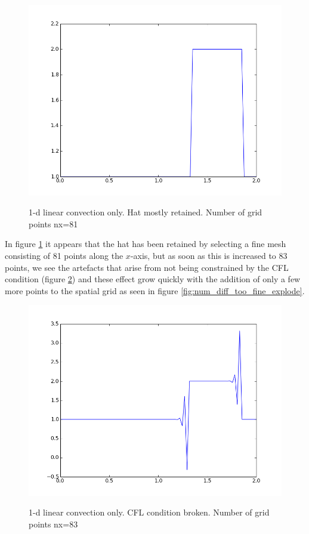 \documentclass[11pt]{article}
\begin{document}
{	\begin{figure}[num_diff_finest_mesh]
	\centering
	\caption{1-d linear convection only. Hat mostly retained. Number of grid points nx=81}
	\includegraphics[scale=0.8]{keep_hat.png}
	\label{fig:num_diff_finest_mesh}
	\end{figure}

In figure \ref{fig:num_diff_finest_mesh} it appears that the hat has been retained by selecting
a fine mesh consisting of 81 points along the $x$-axis, but as soon as this is increased to
83 points, we see the artefacts that arise from not being constrained by the CFL condition
(figure \ref{fig:num_diff_too_fine}) and these effect grow quickly with the addition of only
a few more points to the spatial grid as seen in figure \ref{fig:num_diff_too_fine_explode}.

	\begin{figure}[num_diff_too_fine]
	\centering
	\caption{1-d linear convection only. CFL condition broken. Number of grid points nx=83}
	\includegraphics[scale=0.8]{cfl_broke.png}
	\label{fig:num_diff_too_fine}
	\end{figure}

}
\end{document}
